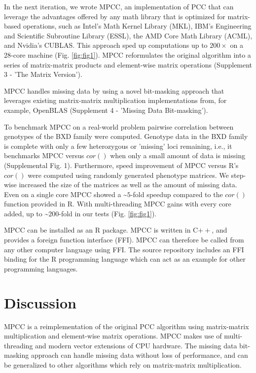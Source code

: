 \documentclass{bioinfo}
\begin{document}
In the next iteration, we wrote MPCC, an implementation of PCC that can 
leverage the advantages offered by any math library that is optimized 
for matrix-based operations, such as Intel’s Math Kernel Library (MKL), 
IBM’s Engineering and Scientific Subroutine Library (ESSL), the AMD 
Core Math Library (ACML), and Nvidia’s CUBLAS. This approach sped up 
computations up to $200\times$ on a 28-core machine (Fig. \ref{fig:fig1}). 
MPCC reformulates the original algorithm into a series of matrix-matrix 
products and element-wise matrix operations (Supplement 3 - 'The Matrix Version'). 

MPCC handles missing data by using a novel bit-masking approach that
leverages existing matrix-matrix multiplication implementations from,
for example, OpenBLAS (Supplement 4 - 'Missing Data Bit-masking').

To benchmark MPCC on a real-world problem pairwise correlation between 
genotypes of the BXD family were computed. Genotype data in the BXD 
family is complete with only a few heterozygous or 'missing' loci 
remaining, i.e., it benchmarks MPCC versus $cor()$ when only a small amount
of data is missing (Supplemental Fig. 1). Furthermore, speed improvement of MPCC
versus R's $cor()$ were computed using randomly generated phenotype matrices. 
We step-wise increased the size of the matrices as well as the amount of 
missing data. Even on a single core MPCC showed a \textasciitilde{}$5$-fold 
speedup compared to the $cor()$ function provided in R. With multi-threading 
MPCC gains with every core added, up to \textasciitilde{}$200$-fold in our 
tests (Fig. \ref{fig:fig1}).

MPCC can be installed as an R package. MPCC is written in C$++$, and
provides a foreign function interface (FFI). MPCC can therefore be
called from any other computer language using FFI. The source
repository includes an FFI binding for the R programming language
which can act as an example for other programming languages.

\section{Discussion}

MPCC is a reimplementation of the original PCC algorithm using matrix-matrix 
multiplication and element-wise matrix operations. MPCC makes use of 
multi-threading and modern vector extensions of CPU hardware. The missing 
data bit-masking approach can handle missing data without loss of performance, 
and can be generalized to other algorithms which rely on matrix-matrix multiplication. 
\end{document}
